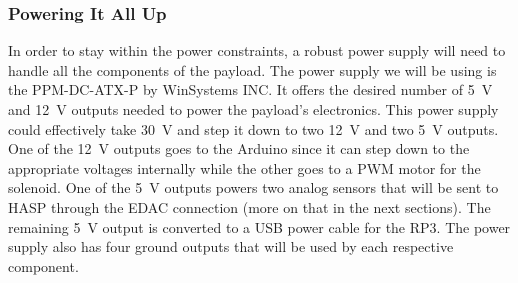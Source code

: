 \subsubsection{Powering It All Up}

In order to stay within the power constraints, a robust power supply will need to  handle all the components of the payload.  The power supply we will be using is the PPM-DC-ATX-P by WinSystems INC.  It offers the desired number of \SI{+5}{\volt} and \SI{+12}{\volt} outputs needed to power the payload's electronics.  This power supply could effectively take \SI{+30}{\volt} and step it down to two \SI{+12}{\volt} and two \SI{+5 }{\volt} outputs.  One of the \SI{+12}{\volt} outputs goes to the Arduino since it can step down to the appropriate voltages internally while the other goes to a PWM motor for the solenoid.  One of the \SI{+5 }{\volt} outputs powers two analog sensors that will be sent to HASP through the EDAC connection (more on that in the next sections).  The remaining \SI{+5 }{\volt} output is converted to a USB power cable for the RP3.  The power supply also has four ground outputs that will be used by each respective component. 



